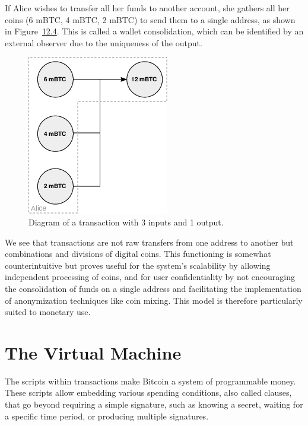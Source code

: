 \documentclass[
  a5paper,
  smalldemyvopaper,10pt,twoside,onecolumn,openright,extrafontsizes,hidelinks]{memoir}
\begin{document}
If Alice wishes to transfer all her funds to another account, she
gathers all her coins (6 mBTC, 4 mBTC, 2 mBTC) to send them to a single
address, as shown in Figure~\hyperref[fig:transaction-3i-1o]{12.4}. This
is called a wallet consolidation, which can be identified by an external
observer due to the uniqueness of the output.

\begin{figure}

{\centering \includegraphics{chapters/img/transaction-3i-1o.png}

}

\caption{Diagram of a transaction with 3 inputs and 1 output.}

\end{figure}%

We see that transactions are not raw transfers from one address to
another but combinations and divisions of digital coins. This
functioning is somewhat counterintuitive but proves useful for the
system's scalability by allowing independent processing of coins, and
for user confidentiality by not encouraging the consolidation of funds
on a single address and facilitating the implementation of anonymization
techniques like coin mixing. This model is therefore particularly suited
to monetary use.

\section*{The Virtual Machine}\label{the-virtual-machine}


The scripts within transactions make Bitcoin a system of programmable
money. These scripts allow embedding various spending conditions, also
called clauses, that go beyond requiring a simple signature, such as
knowing a secret, waiting for a specific time period, or producing
multiple signatures.
\end{document}
